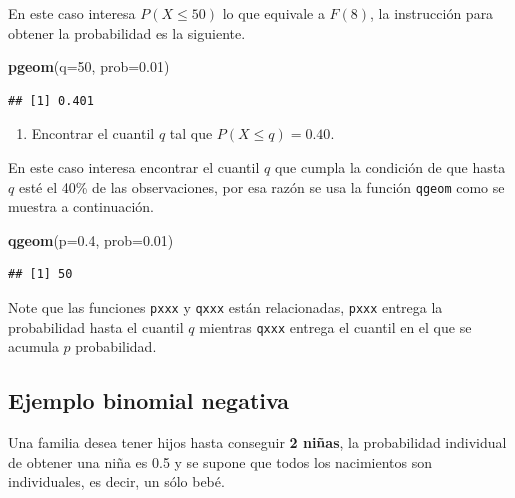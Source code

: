 \documentclass[10pt,]{krantz}
\makeatletter
\newenvironment{Shaded}{\begin{snugshade}}{\end{snugshade}}
\newcommand{\KeywordTok}[1]{\textcolor[rgb]{0.13,0.29,0.53}{\textbf{#1}}}
\newcommand{\DataTypeTok}[1]{\textcolor[rgb]{0.13,0.29,0.53}{#1}}
\newcommand{\DecValTok}[1]{\textcolor[rgb]{0.00,0.00,0.81}{#1}}
\newcommand{\FloatTok}[1]{\textcolor[rgb]{0.00,0.00,0.81}{#1}}
\newcommand{\NormalTok}[1]{#1}
\providecommand{\tightlist}{%
  \setlength{\itemsep}{0pt}\setlength{\parskip}{0pt}}
\newenvironment{kframe}{%
\medskip{}
\setlength{\fboxsep}{.8em}
 \def\at@end@of@kframe{}%
 \ifinner\ifhmode%
  \def\at@end@of@kframe{\end{minipage}}%
  \begin{minipage}{\columnwidth}%
 \fi\fi%
 \def\FrameCommand##1{\hskip\@totalleftmargin \hskip-\fboxsep
 \colorbox{shadecolor}{##1}\hskip-\fboxsep
     \hskip-\linewidth \hskip-\@totalleftmargin \hskip\columnwidth}%
 \MakeFramed {\advance\hsize-\width
   \@totalleftmargin\z@ \linewidth\hsize
   \@setminipage}}%
 {\par\unskip\endMakeFramed%
 \at@end@of@kframe}
\renewenvironment{Shaded}{\begin{kframe}}{\end{kframe}}
\let\BeginKnitrBlock\begin \let\EndKnitrBlock\end
\makeatother
\begin{document}
En este caso interesa \(P(X \leq 50)\) lo que equivale a \(F(8)\), la
instrucción para obtener la probabilidad es la siguiente.

\begin{Shaded}
\begin{Highlighting}[]
\KeywordTok{pgeom}\NormalTok{(}\DataTypeTok{q=}\DecValTok{50}\NormalTok{, }\DataTypeTok{prob=}\FloatTok{0.01}\NormalTok{)}
\end{Highlighting}
\end{Shaded}

\begin{verbatim}
## [1] 0.401
\end{verbatim}

\begin{enumerate}
\def\labelenumi{\arabic{enumi})}
\setcounter{enumi}{2}
\tightlist
\item
  Encontrar el cuantil \(q\) tal que \(P(X \leq q) = 0.40\).
\end{enumerate}

En este caso interesa encontrar el cuantil \(q\) que cumpla la condición
de que hasta \(q\) esté el 40\% de las observaciones, por esa razón se
usa la función \texttt{qgeom} como se muestra a continuación.

\begin{Shaded}
\begin{Highlighting}[]
\KeywordTok{qgeom}\NormalTok{(}\DataTypeTok{p=}\FloatTok{0.4}\NormalTok{, }\DataTypeTok{prob=}\FloatTok{0.01}\NormalTok{)}
\end{Highlighting}
\end{Shaded}

\begin{verbatim}
## [1] 50
\end{verbatim}

\BeginKnitrBlock{rmdnote}
Note que las funciones \texttt{pxxx} y \texttt{qxxx} están relacionadas,
\texttt{pxxx} entrega la probabilidad hasta el cuantil \(q\) mientras
\texttt{qxxx} entrega el cuantil en el que se acumula \(p\)
probabilidad.
\EndKnitrBlock{rmdnote}

\subsection*{Ejemplo binomial negativa}\label{ejemplo-binomial-negativa}


Una familia desea tener hijos hasta conseguir \textbf{2 niñas}, la
probabilidad individual de obtener una niña es 0.5 y se supone que todos
los nacimientos son individuales, es decir, un sólo bebé.
\end{document}
